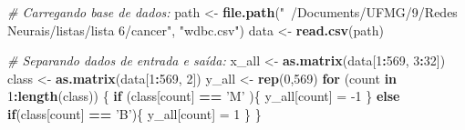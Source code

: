 \documentclass[
]{article}
\newenvironment{Shaded}{\begin{snugshade}}{\end{snugshade}}
\newcommand{\CommentTok}[1]{\textcolor[rgb]{0.56,0.35,0.01}{\textit{#1}}}
\newcommand{\ControlFlowTok}[1]{\textcolor[rgb]{0.13,0.29,0.53}{\textbf{#1}}}
\newcommand{\DecValTok}[1]{\textcolor[rgb]{0.00,0.00,0.81}{#1}}
\newcommand{\KeywordTok}[1]{\textcolor[rgb]{0.13,0.29,0.53}{\textbf{#1}}}
\newcommand{\NormalTok}[1]{#1}
\newcommand{\OperatorTok}[1]{\textcolor[rgb]{0.81,0.36,0.00}{\textbf{#1}}}
\newcommand{\StringTok}[1]{\textcolor[rgb]{0.31,0.60,0.02}{#1}}
\begin{document}
\begin{Shaded}
\begin{Highlighting}[]
\CommentTok{# Carregando base de dados:}
\NormalTok{path <-}\StringTok{ }\KeywordTok{file.path}\NormalTok{(}\StringTok{"~/Documents/UFMG/9/Redes Neurais/listas/lista 6/cancer"}\NormalTok{, }\StringTok{"wdbc.csv"}\NormalTok{)}
\NormalTok{data <-}\StringTok{ }\KeywordTok{read.csv}\NormalTok{(path)}

\CommentTok{# Separando dados de entrada e saída:}
\NormalTok{x_all <-}\StringTok{ }\KeywordTok{as.matrix}\NormalTok{(data[}\DecValTok{1}\OperatorTok{:}\DecValTok{569}\NormalTok{, }\DecValTok{3}\OperatorTok{:}\DecValTok{32}\NormalTok{])}
\NormalTok{class <-}\StringTok{ }\KeywordTok{as.matrix}\NormalTok{(data[}\DecValTok{1}\OperatorTok{:}\DecValTok{569}\NormalTok{, }\DecValTok{2}\NormalTok{])}
\NormalTok{y_all <-}\StringTok{ }\KeywordTok{rep}\NormalTok{(}\DecValTok{0}\NormalTok{,}\DecValTok{569}\NormalTok{)}
\ControlFlowTok{for}\NormalTok{ (count }\ControlFlowTok{in} \DecValTok{1}\OperatorTok{:}\KeywordTok{length}\NormalTok{(class)) \{}
  \ControlFlowTok{if}\NormalTok{ (class[count] }\OperatorTok{==}\StringTok{ 'M'}\NormalTok{ )\{}
\NormalTok{    y_all[count] =}\StringTok{ }\DecValTok{-1}
\NormalTok{  \}}
  \ControlFlowTok{else} \ControlFlowTok{if}\NormalTok{(class[count] }\OperatorTok{==}\StringTok{ 'B'}\NormalTok{)\{}
\NormalTok{    y_all[count] =}\StringTok{ }\DecValTok{1}
\NormalTok{  \}}
\NormalTok{\}}


\end{Highlighting}
\end{Shaded}
\end{document}
